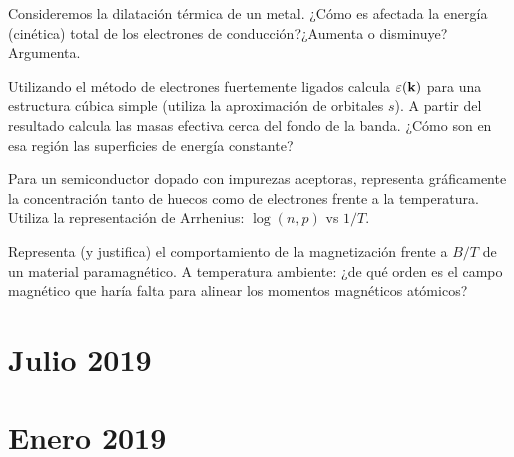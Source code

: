 \begin{ejercicio}
	Consideremos la dilatación térmica de un metal. ¿Cómo es afectada la energía (cinética) total de los electrones de conducción?¿Aumenta o disminuye? Argumenta.
\end{ejercicio}

\begin{ejercicio}
	Utilizando el método de electrones fuertemente ligados calcula $\varepsilon(\mathbf{k})$ para una estructura cúbica simple (utiliza la aproximación de orbitales $s$). A partir del resultado calcula las masas efectiva cerca del fondo de la banda. ¿Cómo son en esa región las superficies de energía constante?
\end{ejercicio}
\begin{ejercicio}
	Para un semiconductor dopado con impurezas aceptoras, representa gráficamente la concentración tanto de huecos como de electrones frente a la temperatura. Utiliza la representación de Arrhenius: $\log (n,p) $ vs $1/T$.
\end{ejercicio}

\begin{ejercicio}
	Representa (y justifica) el comportamiento de la magnetización frente a $B/T$ de un material paramagnético. A temperatura ambiente: ¿de qué orden es el campo magnético que haría falta para alinear los momentos magnéticos atómicos?
\end{ejercicio}

\newpage


\section*{Julio 2019}
\setcounter{section}{4} %

\newpage

\section*{Enero 2019}
\setcounter{section}{5} %


